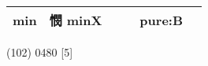 \documentclass[14pt,a4paper]{scrartcl}
\begin{document}
\begin{longtable}[c]{@{}llllll@{}}
\begin{minipage}[t]{0.14\columnwidth}\raggedright\strut
min
\strut\end{minipage} &
\begin{minipage}[t]{0.14\columnwidth}\raggedright\strut
憫 minX
\strut\end{minipage} &
\begin{minipage}[t]{0.14\columnwidth}\raggedright\strut
\strut\end{minipage} &
\begin{minipage}[t]{0.14\columnwidth}\raggedright\strut
\strut\end{minipage} &
\begin{minipage}[t]{0.14\columnwidth}\raggedright\strut
pure:B
\strut\end{minipage}\tabularnewline
\bottomrule
\end{longtable}

(102) 0480 {[}5{]}
\end{document}
